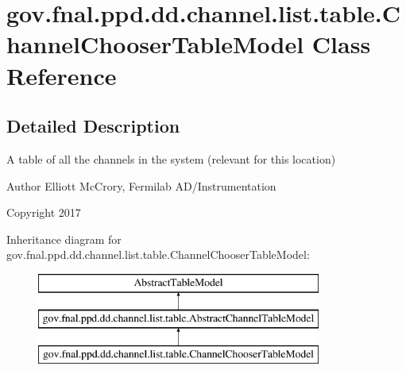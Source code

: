 \hypertarget{classgov_1_1fnal_1_1ppd_1_1dd_1_1channel_1_1list_1_1table_1_1ChannelChooserTableModel}{\section{gov.\-fnal.\-ppd.\-dd.\-channel.\-list.\-table.\-Channel\-Chooser\-Table\-Model Class Reference}
\label{classgov_1_1fnal_1_1ppd_1_1dd_1_1channel_1_1list_1_1table_1_1ChannelChooserTableModel}
}


\subsection{Detailed Description}
A table of all the channels in the system (relevant for this location)

\begin{DoxyAuthor}{Author}
Elliott Mc\-Crory, Fermilab A\-D/\-Instrumentation 
\end{DoxyAuthor}
\begin{DoxyCopyright}{Copyright}
2017 
\end{DoxyCopyright}
Inheritance diagram for gov.\-fnal.\-ppd.\-dd.\-channel.\-list.\-table.\-Channel\-Chooser\-Table\-Model\-:\begin{figure}[H]
\begin{center}
\leavevmode
\includegraphics[height=3.000000cm]{classgov_1_1fnal_1_1ppd_1_1dd_1_1channel_1_1list_1_1table_1_1ChannelChooserTableModel}
\end{center}
\end{figure}

